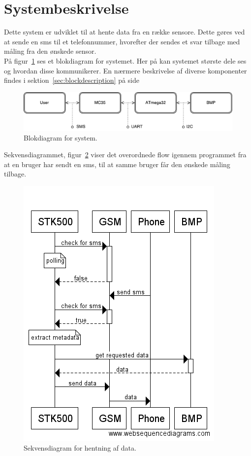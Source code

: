 \section{Systembeskrivelse}
	
Dette system er udviklet til at hente data fra en række sensore. Dette gøres ved at sende en sms til et telefonnummer, hvorefter der sendes et svar tilbage med måling fra den ønskede sensor.\\

På figur~\ref{fig:blockdiagram} ses et blokdiagram for systemet. Her på kan systemet største dele ses og hvordan disse kommunikerer. En nærmere beskrivelse af diverse komponenter findes i sektion~\ref{sec:blockdescription} på side~\pageref{sec:blockdescription}

\vskip 0.5cm
\begin{figure}[h]
	\centering
	\includegraphics[width=\linewidth]{figs/blockdiagram.pdf}
	\caption{Blokdiagram for system.}
	\label{fig:blockdiagram}
\end{figure}
\vskip 0.5cm

Sekvensdiagrammet, figur~\ref{fig:seq-getdata} viser det overordnede flow igennem programmet fra at en bruger har sendt en sms, til at samme bruger får den ønskede måling tilbage.

\begin{figure}[h]
	\centering
	\includegraphics[width=0.56\linewidth]{figs/seq-getdata.png}
	\caption{Sekvensdiagram for hentning af data.}
	\label{fig:seq-getdata}
\end{figure}


